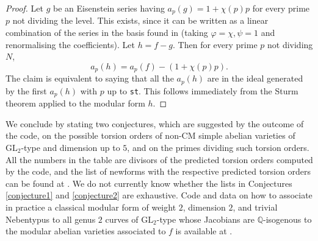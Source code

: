 \documentclass[a4paper,11pt]{amsart}
\theoremstyle{definition}
\newcommand{\Q}{\mathbb Q}
\newcommand{\GL}{\text{GL}}
\begin{document}
\begin{proof}
    Let \(g\) be an Eisenstein series having \(a_p(g)=1+\chi(p)p\) for every prime \(p\) not dividing the level. This exists, since it can be written as a linear combination of the series in the basis found in \cite[\S 4.6]{Diamond2005AForms} (taking \(\varphi=\chi,\psi=1\) and renormalising the coefficients). Let \(h=f-g\). Then for every prime \(p\) not dividing \(N\), 
    \[
    a_p(h) = a_p(f) - (1 + \chi(p)p).
    \]
    The claim is equivalent to saying that all the \(a_p(h)\) are in the ideal generated by the first \(a_p(h)\) with \(p\) up to \texttt{st}. This follows immediately from the Sturm theorem \cite[Corollary 9.20]{Stein2007} applied to the modular form \(h\).
\end{proof}

We conclude by stating two conjectures, which are suggested by the outcome of the code, on the possible torsion orders of non-CM simple abelian varieties of \(\GL_2\)-type and dimension up to \(5\), and on the primes dividing such torsion orders. All the numbers in the table are divisors of the predicted torsion orders computed by the code, and the list of newforms with the respective predicted torsion orders can be found at \cite{Alessandri2026MagmaVarieties}. We do not currently know whether the lists in Conjectures \ref{conjecture1} and \ref{conjecture2} are exhaustive. Code and data on how to associate in practice a classical modular form of weight \(2\), dimension \(2\), and trivial Nebentypus to all genus \(2\) curves of \(\GL_2\)-type whose Jacobians are \(\Q\)-isogenous to the modular abelian varieties associated to \(f\) is available at \cite{CostaModularAbelianSurfaces}.
\end{document}
